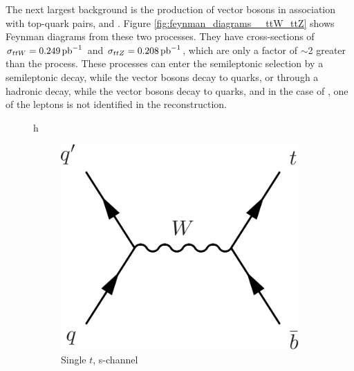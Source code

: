 \par The next largest background is the production of vector bosons in
association with top-quark pairs, \ttW and \ttZ.  Figure
\ref{fig:feynman_diagrams__ttW_ttZ} shows Feynman diagrams from these
two processes.  They have cross-sections of $\sigma_{ttW}=0.249\mbox{\ensuremath{\,\text{pb}^\text{$-$1}}}$
and $\sigma_{ttZ}=0.208\mbox{\ensuremath{\,\text{pb}^\text{$-$1}}}$, which are only a factor of $\sim$2
greater than the \ttH process.  These processes can enter the
semileptonic \ttH selection by a semileptonic \ttbar decay, while the
vector bosons decay to quarks, or through a hadronic \ttbar decay,
while the vector bosons decay to quarks, and in the case of \ttZ, one of
the leptons is not identified in the reconstruction.  

\begin{figure}{h}
    \centering
    \begin{subfigure}[h]{0.3\textwidth}
        \includegraphics[width=\textwidth]{Figures/Feynman_Diagrams/backgrounds_singleT_sChan.pdf}
        \caption{Single $t$, s-channel}\label{fd:t_sChan}
      \end{subfigure}
      ~ %
      \begin{subfigure}[h]{0.3\textwidth}

\end{subfigure}
\end{figure}
